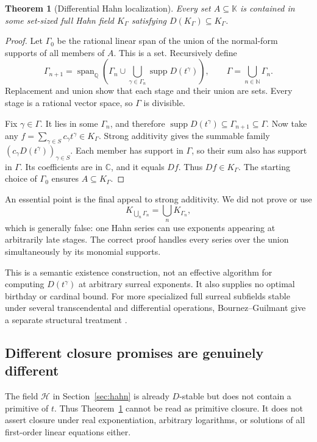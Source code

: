 \documentclass[11pt,a4paper]{article}
\numberwithin{equation}{section}
\newtheorem{theorem}{Theorem}[section]
\theoremstyle{definition}
\theoremstyle{remark}
\newcommand{\K}{\mathbb K}
\newcommand{\C}{\mathbb C}
\newcommand{\Q}{\mathbb Q}
\newcommand{\N}{\mathbb N}
\newcommand{\HH}{\mathscr H}
\newcommand{\supp}{\operatorname{supp}}
\newcommand{\Span}{\operatorname{span}}
\begin{document}
\begin{theorem}[Differential Hahn localization]\label{thm:localization}
Every set $A\subseteq\K$ is contained in some set-sized full Hahn field
$K_\Gamma$ satisfying $D(K_\Gamma)\subseteq K_\Gamma$.
\end{theorem}
\begin{proof}
Let $\Gamma_0$ be the rational linear span of the union of the normal-form
supports of all members of $A$. This is a set. Recursively define
\begin{equation}\label{eq:Gamma-closure}
 \Gamma_{n+1}=\Span_\Q\left(
 \Gamma_n\cup\bigcup_{\gamma\in\Gamma_n}\supp D(t^\gamma)
 \right),\qquad
 \Gamma=\bigcup_{n\in\N}\Gamma_n.
\end{equation}
Replacement and union show that each stage and their union are sets.
Every stage is a rational vector space, so $\Gamma$ is divisible.

Fix $\gamma\in\Gamma$. It lies in some $\Gamma_n$, and therefore
$\supp D(t^\gamma)\subseteq\Gamma_{n+1}\subseteq\Gamma$.
Now take any
$f=\sum_{\gamma\in S}c_\gamma t^\gamma\in K_\Gamma$.
Strong additivity gives the summable family
$(c_\gamma D(t^\gamma))_{\gamma\in S}$. Each member has support in
$\Gamma$, so their sum also has support in $\Gamma$. Its coefficients
are in $\C$, and it equals $Df$. Thus $Df\in K_\Gamma$.
The starting choice of $\Gamma_0$ ensures $A\subseteq K_\Gamma$.
\end{proof}

An essential point is the final appeal to strong additivity. We did not
prove or use
\[
 K_{\bigcup_n\Gamma_n}=\bigcup_nK_{\Gamma_n},
\]
which is generally false: one Hahn series can use exponents appearing at
arbitrarily late stages. The correct proof handles every series over the
union simultaneously by its monomial supports.

This is a semantic existence construction, not an effective algorithm for
computing $D(t^\gamma)$ at arbitrary surreal exponents. It also supplies
no optimal birthday or cardinal bound. For more specialized full surreal
subfields stable under several transcendental and differential operations,
Bournez--Guilmant give a separate structural treatment \cite{BG}.

\subsection{Different closure promises are genuinely different}

The field $\HH$ in Section~\ref{sec:hahn} is already $D$-stable but does
not contain a primitive of $t$. Thus Theorem~\ref{thm:localization} cannot
be read as primitive closure. It does not assert closure under real
exponentiation, arbitrary logarithms, or solutions of all first-order
linear equations either.
\end{document}
